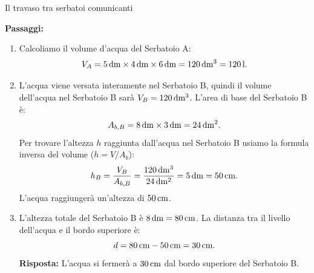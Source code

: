 \begin{esercizio}{Il travaso tra serbatoi comunicanti}
\begin{soluzione}
  \textbf{Passaggi:}
  \begin{enumerate}[label=\alph*)]
    \item Calcoliamo il volume d'acqua del Serbatoio A:
    \[
    V_A = 5\,\mathrm{dm} \times 4\,\mathrm{dm} \times 6\,\mathrm{dm} = 120\,\mathrm{dm^3} = 120\,\mathrm{l}.
    \]
    \item L'acqua viene versata interamente nel Serbatoio B, quindi il volume dell'acqua nel Serbatoio B sarà $V_B = 120\,\mathrm{dm^3}$.
    L'area di base del Serbatoio B è:
    \[
    A_{b,B} = 8\,\mathrm{dm} \times 3\,\mathrm{dm} = 24\,\mathrm{dm^2}.
    \]
    Per trovare l'altezza $h$ raggiunta dall'acqua nel Serbatoio B usiamo la formula inversa del volume ($h = V / A_b$):
    \[
    h_B = \frac{V_B}{A_{b,B}} = \frac{120\,\mathrm{dm^3}}{24\,\mathrm{dm^2}} = 5\,\mathrm{dm} = 50\,\mathrm{cm}.
    \]
    L'acqua raggiungerà un'altezza di $50\,\mathrm{cm}$.
    \item L'altezza totale del Serbatoio B è $8\,\mathrm{dm} = 80\,\mathrm{cm}$.
    La distanza tra il livello dell'acqua e il bordo superiore è:
    \[
    d = 80\,\mathrm{cm} - 50\,\mathrm{cm} = 30\,\mathrm{cm}.
    \]
    \textbf{Risposta:} L'acqua si fermerà a $30\,\mathrm{cm}$ dal bordo superiore del Serbatoio B.
  \end{enumerate}
\end{soluzione}
\end{esercizio}

\condnewpage


